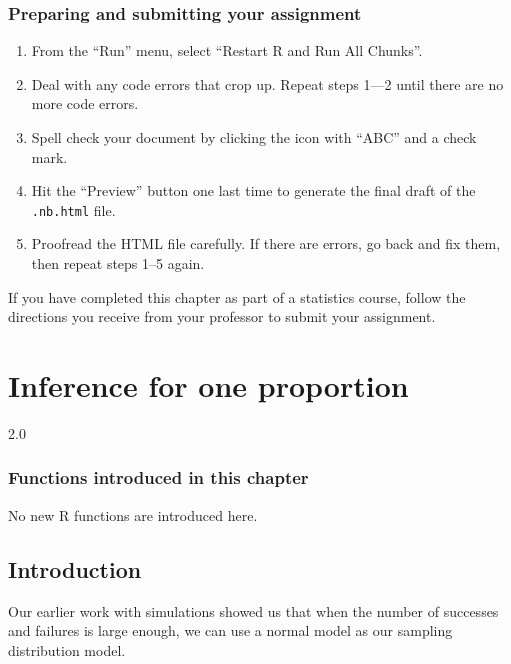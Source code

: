 \documentclass[
]{book}
\providecommand{\tightlist}{%
  \setlength{\itemsep}{0pt}\setlength{\parskip}{0pt}}
\begin{document}
\hypertarget{samp-dist-models-prep}{%
\subsection{Preparing and submitting your assignment}\label{samp-dist-models-prep}}

\begin{enumerate}
\def\labelenumi{\arabic{enumi}.}
\tightlist
\item
  From the ``Run'' menu, select ``Restart R and Run All Chunks''.
\item
  Deal with any code errors that crop up. Repeat steps 1---2 until there are no more code errors.
\item
  Spell check your document by clicking the icon with ``ABC'' and a check mark.
\item
  Hit the ``Preview'' button one last time to generate the final draft of the \texttt{.nb.html} file.
\item
  Proofread the HTML file carefully. If there are errors, go back and fix them, then repeat steps 1--5 again.
\end{enumerate}

If you have completed this chapter as part of a statistics course, follow the directions you receive from your professor to submit your assignment.

\hypertarget{one-prop}{%
\chapter{Inference for one proportion}\label{one-prop}}

2.0

\hypertarget{functions-introduced-in-this-chapter-14}{%
\subsection*{Functions introduced in this chapter}\label{functions-introduced-in-this-chapter-14}}

No new R functions are introduced here.

\hypertarget{one-prop-intro}{%
\section{Introduction}\label{one-prop-intro}}

Our earlier work with simulations showed us that when the number of successes and failures is large enough, we can use a normal model as our sampling distribution model.
\end{document}
